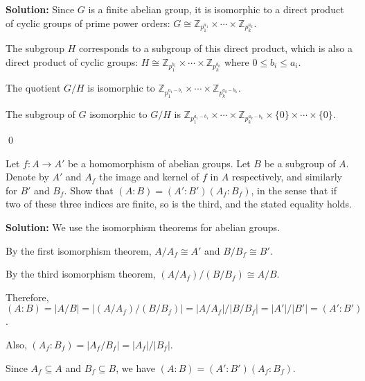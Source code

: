 \noindent\textbf{Solution:} Since $G$ is a finite abelian group, it is isomorphic to a direct product of cyclic groups of prime power orders: $G \cong \mathbb{Z}_{p_1^{a_1}} \times \cdots \times \mathbb{Z}_{p_k^{a_k}}$.

The subgroup $H$ corresponds to a subgroup of this direct product, which is also a direct product of cyclic groups: $H \cong \mathbb{Z}_{p_1^{b_1}} \times \cdots \times \mathbb{Z}_{p_k^{b_k}}$ where $0 \leq b_i \leq a_i$.

The quotient $G/H$ is isomorphic to $\mathbb{Z}_{p_1^{a_1-b_1}} \times \cdots \times \mathbb{Z}_{p_k^{a_k-b_k}}$.

The subgroup of $G$ isomorphic to $G/H$ is $\mathbb{Z}_{p_1^{a_1-b_1}} \times \cdots \times \mathbb{Z}_{p_k^{a_k-b_k}} \times \{0\} \times \cdots \times \{0\}$.


\qed
\begin{problembox}
Let $f: A \to A'$ be a homomorphism of abelian groups. Let $B$ be a subgroup of $A$. Denote by $A'$ and $A_f$ the image and kernel of $f$ in $A$ respectively, and similarly for $B'$ and $B_f$. Show that $(A : B) = (A' : B')(A_f : B_f)$, in the sense that if two of these three indices are finite, so is the third, and the stated equality holds.
\end{problembox}

\noindent\textbf{Solution:} We use the isomorphism theorems for abelian groups.

By the first isomorphism theorem, $A/A_f \cong A'$ and $B/B_f \cong B'$.

By the third isomorphism theorem, $(A/A_f)/(B/B_f) \cong A/B$.

Therefore, $(A : B) = |A/B| = |(A/A_f)/(B/B_f)| = |A/A_f|/|B/B_f| = |A'|/|B'| = (A' : B')$.

Also, $(A_f : B_f) = |A_f/B_f| = |A_f|/|B_f|$.

Since $A_f \subseteq A$ and $B_f \subseteq B$, we have $(A : B) = (A' : B')(A_f : B_f)$.


